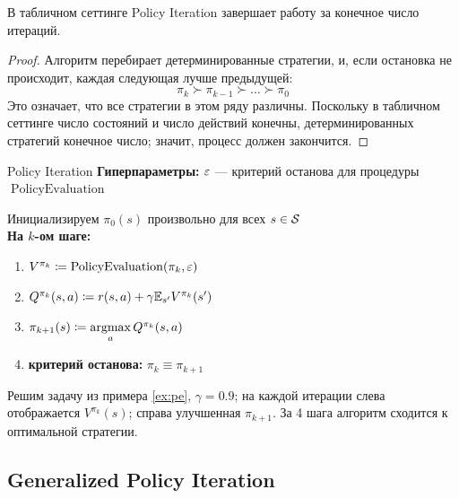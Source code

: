 \begin{theorem}
В табличном сеттинге Policy Iteration завершает работу за конечное число итераций.
\begin{proof}
Алгоритм перебирает детерминированные стратегии, и, если остановка не происходит, каждая следующая лучше предыдущей:
$$\pi_k \succ \pi_{k-1} \succ \dots \succ \pi_0$$
Это означает, что все стратегии в этом ряду различны. Поскольку в табличном сеттинге число состояний и число действий конечны, детерминированных стратегий конечное число; значит, процесс должен закончится.
\end{proof}
\end{theorem}

\begin{algorithm}[label=policyiteration]{Policy Iteration}
\textbf{Гиперпараметры:} $\varepsilon$ --- критерий останова для процедуры $\operatorname{PolicyEvaluation}$

\vspace{0.3cm}
Инициализируем $\pi_0(s)$ произвольно для всех $s \in \mathcal{S}$ \\
\textbf{На $k$-ом шаге:}
\begin{enumerate}
    \item $V^{\pi_k} \coloneqq \operatorname{PolicyEvaluation}(\pi_k, \varepsilon)$
    \item $Q^{\pi_k}(s, a) \coloneqq r(s, a) + \gamma \mathbb{E}_{s'} V^{\pi_k}(s')$
    \item $\pi_{k+1}(s) \coloneqq \mathop{\mathrm{argmax}}\limits_a Q^{\pi_k}(s, a)$
    \item \textbf{критерий останова:} $\pi_k \equiv \pi_{k+1}$
\end{enumerate}
\end{algorithm}

\begin{exampleBox}[righthand ratio=0.5, sidebyside, sidebyside align=center, lower separated=false]{}
Решим задачу из примера \ref{ex:pe}, $\gamma = 0.9$; на каждой итерации слева отображается $V^{\pi_k}(s)$; справа улучшенная $\pi_{k+1}$. За 4 шага алгоритм сходится к оптимальной стратегии.

\tcblower
\end{exampleBox}

\subsection{Generalized Policy Iteration}

